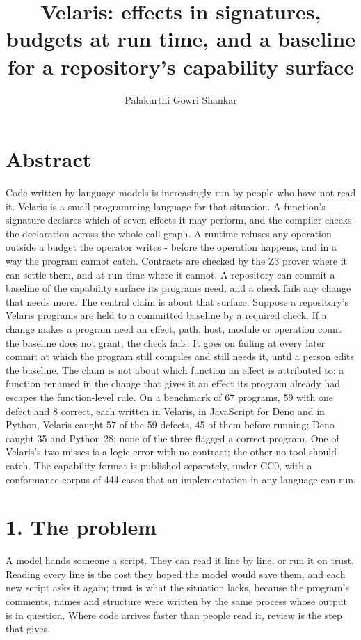 \documentclass[
]{article}
\title{Velaris: effects in signatures, budgets at run time, and a
baseline for a repository's capability surface}
\author{Palakurthi Gowri Shankar}
\date{}
\newcounter{none} %
\begin{document}
\maketitle

\section{Abstract}\label{abstract}

Code written by language models is increasingly run by people who have
not read it. Velaris is a small programming language for that situation.
A function's signature declares which of seven effects it may perform,
and the compiler checks the declaration across the whole call graph. A
runtime refuses any operation outside a budget the operator writes -
before the operation happens, and in a way the program cannot catch.
Contracts are checked by the Z3 prover where it can settle them, and at
run time where it cannot. A repository can commit a baseline of the
capability surface its programs need, and a check fails any change that
needs more. The central claim is about that surface. Suppose a
repository's Velaris programs are held to a committed baseline by a
required check. If a change makes a program need an effect, path, host,
module or operation count the baseline does not grant, the check fails.
It goes on failing at every later commit at which the program still
compiles and still needs it, until a person edits the baseline. The
claim is not about which function an effect is attributed to: a function
renamed in the change that gives it an effect its program already had
escapes the function-level rule. On a benchmark of 67 programs, 59 with
one defect and 8 correct, each written in Velaris, in JavaScript for
Deno and in Python, Velaris caught 57 of the 59 defects, 45 of them
before running; Deno caught 35 and Python 28; none of the three flagged
a correct program. One of Velaris's two misses is a logic error with no
contract; the other no tool should catch. The capability format is
published separately, under CC0, with a conformance corpus of 444 cases
that an implementation in any language can run.

\section{1. The problem}\label{the-problem}

A model hands someone a script. They can read it line by line, or run it
on trust. Reading every line is the cost they hoped the model would save
them, and each new script asks it again; trust is what the situation
lacks, because the program's comments, names and structure were written
by the same process whose output is in question. Where code arrives
faster than people read it, review is the step that gives.
\end{document}
